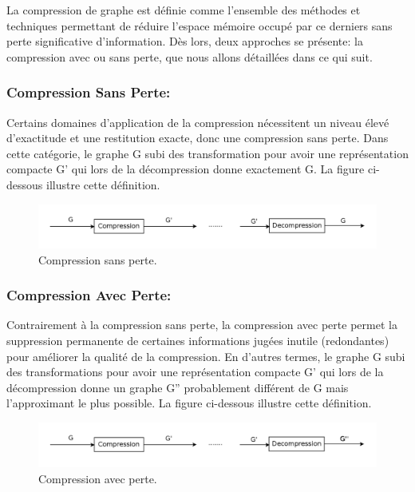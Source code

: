 La compression de graphe est définie comme l'ensemble des méthodes et techniques permettant de réduire l'espace mémoire occupé par ce derniers sans perte significative d'information. Dès lors, deux approches se présente: la compression avec ou sans perte, que nous allons détaillées dans ce qui suit.
			
			\subsubsection{Compression Sans Perte:}
			Certains domaines d'application de la compression nécessitent un niveau élevé d'exactitude et une restitution exacte, donc une compression sans perte. Dans cette catégorie, le graphe G subi des transformation pour avoir une représentation compacte G' qui lors de la décompression donne exactement G. La figure ci-dessous illustre cette définition. 
			
			\begin{figure}[h]
			\includegraphics[scale=0.15,center]{./ressources/image/SansPerte.png}
			\caption[Compression sans perte.]{Compression sans perte.}
			\end{figure}
			
			
			\subsubsection{Compression Avec Perte:}
			Contrairement à la compression sans perte, la compression avec perte permet la suppression permanente de certaines informations jugées inutile (redondantes) pour améliorer la qualité de la compression.  En d'autres termes, le graphe G subi des transformations pour avoir une représentation compacte G' qui lors de la décompression donne un graphe G'' probablement différent de G mais l'approximant le plus possible. La figure ci-dessous illustre cette définition.   
			
			\begin{figure}[h]
			\includegraphics[scale=0.15,center]{./ressources/image/AvecPerte.png}
			\caption[Compression avec perte.]{Compression avec perte.}
			\end{figure}
			
